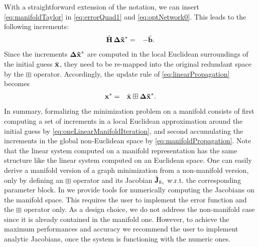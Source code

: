 \documentclass[a4paper]{article}
\begin{document}
With a straightforward extension of the notation, we can insert
\eqref{eq:manifoldTaylor} in \eqref{eq:errorQuad1} and
\eqref{eq:optNetwork0}. This leads to the following increments:
\begin{eqnarray}
       \tilde {\mathbf{H}} \, \mathbf{\Delta \tilde x}^* &=& - \tilde {\mathbf{b}} .
\label{eq:oneLinearManifoldIteration}
\end{eqnarray}
Since the increments $\mathbf{\Delta \tilde x}^*$ are computed in the local Euclidean
surroundings of the initial guess $\breve{\mathbf{x}}$, they need to be
re-mapped into the original redundant space by the $\boxplus$
operator. Accordingly, the update rule of \eqref{eq:linearPropagation}
becomes
\begin{eqnarray}
  \mathbf{x}^*& =& \breve{\mathbf{x}} \boxplus \mathbf{\Delta \tilde x}^*.
\label{eq:manifoldPropagation}
\end{eqnarray}
In summary, formalizing the minimization problem on a manifold consists
of first computing a set of increments in a local Euclidean
approximation around the initial guess by
\eqref{eq:oneLinearManifoldIteration}, and second accumulating the
increments in the global non-Euclidean space by
\eqref{eq:manifoldPropagation}.  Note that the linear system computed on
a manifold representation has the same structure like the linear system
computed on an Euclidean space.  One can easily derive a manifold
version of a graph minimization from a non-manifold version, only by
defining an $\boxplus$ operator and its Jacobian $\tilde {\mathbf{J}}_{k_{i}}$
w.r.t.  the corresponding parameter block.  In \gopt{} we provide tools
for numerically computing the Jacobians on the manifold space.  This
requires the user to implement the error function and the $\boxplus$
operator only. As a design choice, we do not address the non-manifold
case since it is already contained in the manifold one.  However, to
achieve the maximum performances and accuracy we recommend the user to
implement analytic Jacobians, once the system is functioning with the
numeric ones.
\end{document}

